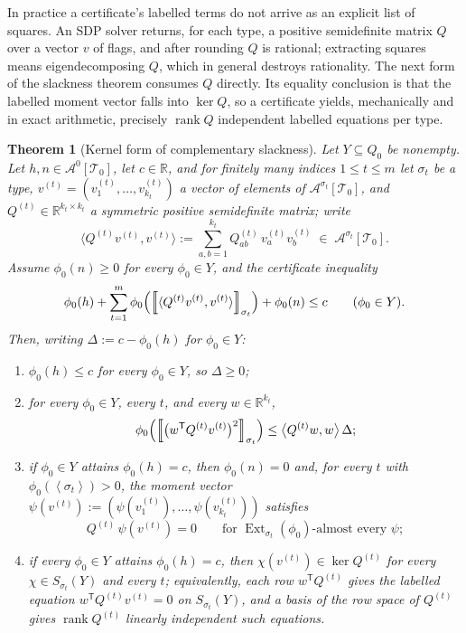 \documentclass[11pt]{article}
\newtheorem{theorem}{Theorem}
\theoremstyle{definition}
\newcommand{\R}{\mathbb{R}}
\newcommand{\A}{\mathcal{A}}
\newcommand{\T}{\mathcal{T}}
\newcommand{\Ext}{\operatorname{Ext}}
\newcommand{\brak}[1]{\left\langle #1\right\rangle}
\newcommand{\avg}[2]{\left\llbracket #1 \right\rrbracket_{#2}}
\begin{document}
In practice a certificate's labelled terms do not arrive as an explicit list of squares.
An SDP solver returns, for each type, a positive semidefinite matrix $Q$ over a vector
$v$ of flags, and after rounding $Q$ is rational; extracting squares means
eigendecomposing $Q$, which in general destroys rationality.  The next form of the
slackness theorem consumes $Q$ directly.  Its equality conclusion is that the labelled
moment vector falls into $\ker Q$, so a certificate yields, mechanically and in exact
arithmetic, precisely $\operatorname{rank}Q$ independent labelled equations per type.

\begin{theorem}[Kernel form of complementary slackness]\label{thm:kernel-slackness}
Let $Y\subseteq Q_0$ be nonempty.  Let $h,n\in\A^0[\T_0]$, let $c\in\R$, and for finitely
many indices $1\le t\le m$ let $\sigma_t$ be a type, $v^{(t)}=(v^{(t)}_1,\dots,v^{(t)}_{k_t})$
a vector of elements of $\A^{\sigma_t}[\T_0]$, and $Q^{(t)}\in\R^{k_t\times k_t}$ a
symmetric positive semidefinite matrix; write
\[
  \bigl\langle Q^{(t)}v^{(t)},v^{(t)}\bigr\rangle
  :=
  \sum_{a,b=1}^{k_t}Q^{(t)}_{ab}\,v^{(t)}_a v^{(t)}_b
  \;\in\;\A^{\sigma_t}[\T_0].
\]
Assume $\phi_0(n)\ge0$ for every $\phi_0\in Y$, and the certificate inequality
\[
  \phi_0(h)
  +\sum_{t=1}^m\phi_0\Bigl(\avg{\langle Q^{(t)}v^{(t)},v^{(t)}\rangle}{\sigma_t}\Bigr)
  +\phi_0(n)\le c
  \qquad(\phi_0\in Y).
\]
Then, writing $\Delta:=c-\phi_0(h)$ for $\phi_0\in Y$:
\begin{enumerate}[label=\textup{(\arabic*)}, leftmargin=2.8em]
  \item\label{ks-soundness} $\phi_0(h)\le c$ for every $\phi_0\in Y$, so $\Delta\ge0$;
  \item\label{ks-approx} for every $\phi_0\in Y$, every $t$, and every $w\in\R^{k_t}$,
  \[
    \phi_0\Bigl(\avg{\bigl(w^{\mathsf T}Q^{(t)}v^{(t)}\bigr)^2}{\sigma_t}\Bigr)
    \le
    \bigl\langle Q^{(t)}w,w\bigr\rangle\,\Delta ;
  \]
  \item\label{ks-exact} if $\phi_0\in Y$ attains $\phi_0(h)=c$, then $\phi_0(n)=0$ and,
  for every $t$ with $\phi_0(\brak{\sigma_t})>0$, the moment vector
  $\psi(v^{(t)}):=(\psi(v^{(t)}_1),\dots,\psi(v^{(t)}_{k_t}))$ satisfies
  \[
    Q^{(t)}\,\psi(v^{(t)})=0
    \qquad\text{for }\Ext_{\sigma_t}(\phi_0)\text{-almost every }\psi ;
  \]
  \item\label{ks-global} if every $\phi_0\in Y$ attains $\phi_0(h)=c$, then
  $\chi(v^{(t)})\in\ker Q^{(t)}$ for every $\chi\in S_{\sigma_t}(Y)$ and every $t$;
  equivalently, each row $w^{\mathsf T}Q^{(t)}$ gives the labelled equation
  $w^{\mathsf T}Q^{(t)}v^{(t)}=0$ on $S_{\sigma_t}(Y)$, and a basis of the row space of
  $Q^{(t)}$ gives $\operatorname{rank}Q^{(t)}$ linearly independent such equations.
\end{enumerate}
\end{theorem}
\end{document}
